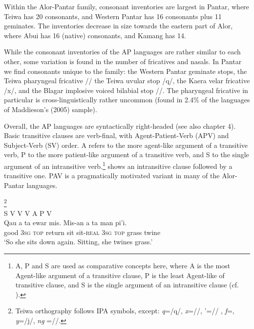 Within the Alor-Pantar family, consonant inventories are largest in Pantar, where Teiwa has 20 consonants, and Western Pantar has 16 consonants plus 11 geminates. The inventories decrease in size towards the eastern part of Alor, where Abui has 16 (native) consonants, and Kamang has 14. 

While the consonant inventories of the AP languages are rather similar to each other, some variation is found in the number of fricatives and nasals. In Pantar we find consonants unique to the family: the Western Pantar geminate stops, the Teiwa pharyngeal fricative /{\pharfric}/ the Teiwa uvular stop /q/, the Kaera velar fricative /x/, and the Blagar implosive voiced bilabial stop /{\texthtb}/. The pharyngeal fricative in particular is cross-linguistically rather uncommon (found in 2.4\% of  the languages of Maddieson's (2005) sample). \nocite{Maddieson2005}

Overall, the AP languages are syntactically right-headed (see also chapter 4). Basic transitive clauses are verb-final, with Agent-Patient-Verb (APV) and Subject-Verb (SV) order. A refers to the more agent-like argument of a transitive verb, P to the more patient-like argument of a transitive verb, and S to the single argument of an intransitive verb.\footnote{A, P and S are used as comparative concepts here, where A is the most Agent-like argument of a transitive clause, P is the least Agent-like of transitive clause, and S is the single argument of an intransitive clause (cf. \citealt{Comrie1989,Haspelmath2011}).}   shows an intransitive clause followed by a transitive one. PAV is a pragmatically motivated variant in many of the Alor-Pantar languages.

\let\eachwordone=\rm
\let\eachwordone=\it
\ea%
\label{bkm:Ref336875300}
\footnote{Teiwa orthography follows IPA symbols, except: \textit{q}=/q/, \textit{x}=/{\pharfric}/, '=/{\textglotstop}/ , \textit{f}={\textphi}, \textit{y}=/j/, \textit{ng} =/{\ng}/.}  \\
\glll {}  S  {}  V  V  V  A  {}  P  V \\  
Qau  a  ta  ewar  mis.  Mis-an  a  ta  man  pi'i.\\
good  3\textsc{sg}  \textsc{top} return  sit  sit-\textsc{real} 3\textsc{sg}  \textsc{top} grass  twine\\
\glt  `So she sits down again. Sitting, she twines grass.'
\z
\let\eachwordone=\it
\let\eachwordone=\rm


